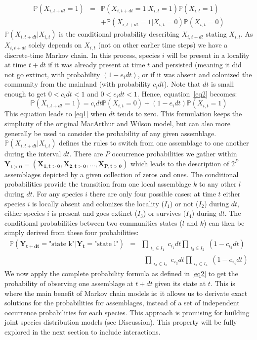 \begin{eqnarray}
\nonumber \mathbb{P}(X_{i,t+dt}=1) &=& \mathbb{P}(X_{i,t+dt}=1|X_{i,t}=1)\mathbb{P}(X_{i,t}=1) \\
\label{eq2} & & +\mathbb{P}(X_{i,t+dt}=1|X_{i,t}=0)\mathbb{P}(X_{i,t}=0)
\end{eqnarray}
$\mathbb{P}(X_{i,t+dt}|X_{i,t})$ is the conditional probability describing $X_{i,t+dt}$ stating $X_{i,t}$. As $X_{i,t+dt}$ solely depends on $X_{i,t}$ (not on other earlier time steps) we have a discrete-time Markov chain. In this process, species $i$ will be present in a locality at time $t+dt$ if it was already present at time $t$ and persisted (meaning it did not go extinct, with probability $(1-e_idt)$, or if it was absent and colonized the community from the mainland (with probability $c_idt$). Note that $dt$ is small enough to get $0<c_idt<1$ and $0<e_idt<1$. Hence, equation~\eqref{eq2} becomes:
\begin{equation}
\label{eq3} \mathbb{P}(X_{i,t+dt}=1)=c_idt\mathbb{P}(X_{i,t}=0)+(1-e_idt)\mathbb{P}(X_{i,t}=1)
\end{equation}
This equation leads to \eqref{eq1} when $dt$ tends to zero. This formulation keeps the simplicity of the original MacArthur and Wilson model, but can also more generally be used to consider the probability of any given assemblage. $\mathbb{P}(X_{i,t+dt}|X_{i,t})$ defines the rules to switch from one assemblage to one another during the interval $dt$.
There are $P$ occurrence probabilities we gather within $\mathbf{Y_{t>0}}=(\mathbf{X_{1,t>0}}, \mathbf{X_{2,t>0}}, ..., \mathbf{X_{P,t>0}})$ which leads to the description of $2^P$ assemblages depicted by a given collection of zeros and ones.
The conditional probabilities provide the transition from one local assemblage $k$ to any other $l$ during $dt$. For any species $i$ there are only four possible cases: at time $t$ either species $i$ is locally absent and colonizes the locality ($I_1$) or not ($I_2$) during $dt$, either species $i$ is present and goes extinct ($I_3$) or survives ($I_4$) during $dt$. The conditional probabilities between two communities states ($l$ and $k$) can then be simply derived from these four probabilities:
\begin{eqnarray}
 \nonumber \mathbb{P}(\mathbf{Y_{t+dt}}=\text{"state k"}| \mathbf{Y_{t}}=\text{"state l"}) &=& \prod_{\substack{i_1\in I_1}}c_{i_1}dt\prod_{\substack{i_2\in I_2}}(1-c_{i_2}dt)
\\  \label{eq4} & &~~\prod_{\substack{i_3\in I_3}}e_{i_3}dt\prod_{\substack{i_4\in I_4}}(1-e_{i_4}dt)
\end{eqnarray}
We now apply the complete probability formula as defined in \eqref{eq2} to get the probability of observing one assemblage at $t+dt$ given its state at $t$. This is where the main benefit of Markov chain models is: it allows us to derivate exact solutions for the probabilities for assemblages, instead of a set of independent occurrence probabilities for each species. This approach is promising for building joint species distribution models (see Discussion). This property will be fully explored in the next section to include interactions.

